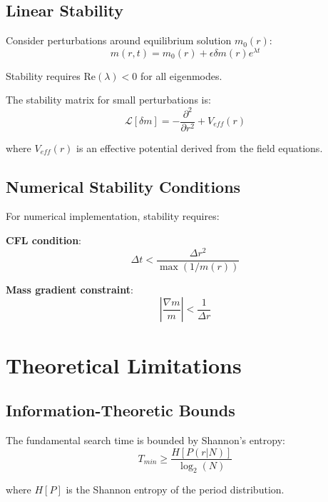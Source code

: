 \documentclass[12pt,a4paper]{article}
\begin{document}
	\subsection{Linear Stability}
	
	Consider perturbations around equilibrium solution $m_0(r)$:
	\begin{equation}
		m(r,t) = m_0(r) + \epsilon \delta m(r) e^{\lambda t}
	\end{equation}
	
	Stability requires $\text{Re}(\lambda) < 0$ for all eigenmodes.
	
	The stability matrix for small perturbations is:
	\begin{equation}
		\mathcal{L}[\delta m] = -\frac{\partial^2}{\partial r^2} + V_{eff}(r)
	\end{equation}
	
	where $V_{eff}(r)$ is an effective potential derived from the field equations.
	
	\subsection{Numerical Stability Conditions}
	
	For numerical implementation, stability requires:
	
	\textbf{CFL condition}:
	\begin{equation}
		\Delta t < \frac{\Delta r^2}{\max(1/m(r))}
	\end{equation}
	
	\textbf{Mass gradient constraint}:
	\begin{equation}
		\left|\frac{\nabla m}{m}\right| < \frac{1}{\Delta r}
	\end{equation}
	
	\section{Theoretical Limitations}
	
	\subsection{Information-Theoretic Bounds}
	
	The fundamental search time is bounded by Shannon's entropy:
	\begin{equation}
		T_{min} \geq \frac{H[P(r|N)]}{\log_2(N)}
	\end{equation}
	
	where $H[P]$ is the Shannon entropy of the period distribution.
	
\end{document}
